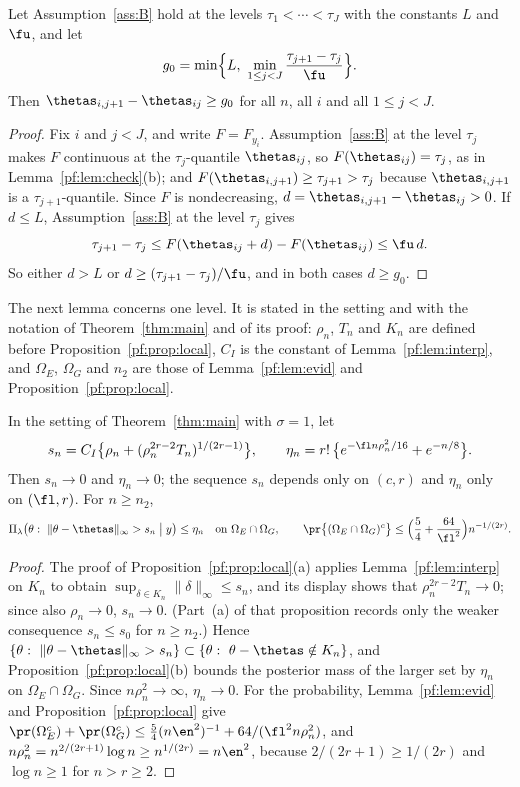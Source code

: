 \begin{lemma}[separation]\label{pf:lem:gap}
Let Assumption~\ref{ass:B} hold at the levels $\tau_1<\cdots<\tau_J$ with the constants $L$ and $\fu$, and let
\[
g_0=\min\Bigl\{L,\ \min_{1\le j<J}\frac{\tau_{j+1}-\tau_j}{\fu}\Bigr\}.
\]
Then $\thetas_{i,j+1}-\thetas_{ij}\ge g_0$ for all $n$, all $i$ and all $1\le j<J$.
\end{lemma}

\begin{proof}
Fix $i$ and $j<J$, and write $F=F_{y_i}$. Assumption~\ref{ass:B} at the level $\tau_j$ makes $F$ continuous at the $\tau_j$-quantile $\thetas_{ij}$, so $F(\thetas_{ij})=\tau_j$, as in Lemma~\ref{pf:lem:check}(b); and $F(\thetas_{i,j+1})\ge\tau_{j+1}>\tau_j$ because $\thetas_{i,j+1}$ is a $\tau_{j+1}$-quantile. Since $F$ is nondecreasing, $d=\thetas_{i,j+1}-\thetas_{ij}>0$. If $d\le L$, Assumption~\ref{ass:B} at the level $\tau_j$ gives
\[
\tau_{j+1}-\tau_j\le F(\thetas_{ij}+d)-F(\thetas_{ij})\le\fu\,d .
\]
So either $d>L$ or $d\ge(\tau_{j+1}-\tau_j)/\fu$, and in both cases $d\ge g_0$.
\end{proof}

The next lemma concerns one level. It is stated in the setting and with the notation of Theorem~\ref{thm:main} and of its proof: $\rho_n$, $T_n$ and $K_n$ are defined before Proposition~\ref{pf:prop:local}, $C_I$ is the constant of Lemma~\ref{pf:lem:interp}, and $\Omega_E$, $\Omega_G$ and $n_2$ are those of Lemma~\ref{pf:lem:evid} and Proposition~\ref{pf:prop:local}.

\begin{lemma}\label{pf:lem:sup}
In the setting of Theorem~\ref{thm:main} with $\sigma=1$, let
\[
s_n=C_I\bigl\{\rho_n+(\rho_n^{2r-2}T_n)^{1/(2r-1)}\bigr\},\qquad \eta_n=r!\,\bigl\{e^{-\fl n\rho_n^2/16}+e^{-n/8}\bigr\}.
\]
Then $s_n\to0$ and $\eta_n\to0$; the sequence $s_n$ depends only on $(c,r)$ and $\eta_n$ only on $(\fl,r)$. For $n\ge n_2$,
\[
\Pi_\lambda\bigl(\theta:\ \|\theta-\thetas\|_\infty>s_n\bigm|y\bigr)\le\eta_n\quad\text{on }\Omega_E\cap\Omega_G,
\qquad
\pr\bigl\{(\Omega_E\cap\Omega_G)^c\bigr\}\le\Bigl(\frac54+\frac{64}{\fl^2}\Bigr)n^{-1/(2r)} .
\]
\end{lemma}

\begin{proof}
The proof of Proposition~\ref{pf:prop:local}(a) applies Lemma~\ref{pf:lem:interp} on $K_n$ to obtain $\sup_{\delta\in K_n}\|\delta\|_\infty\le s_n$, and its display shows that $\rho_n^{2r-2}T_n\to0$; since also $\rho_n\to0$, $s_n\to0$. (Part~(a) of that proposition records only the weaker consequence $s_n\le s_0$ for $n\ge n_2$.) Hence $\{\theta:\ \|\theta-\thetas\|_\infty>s_n\}\subset\{\theta:\ \theta-\thetas\notin K_n\}$, and Proposition~\ref{pf:prop:local}(b) bounds the posterior mass of the larger set by $\eta_n$ on $\Omega_E\cap\Omega_G$. Since $n\rho_n^2\to\infty$, $\eta_n\to0$. For the probability, Lemma~\ref{pf:lem:evid} and Proposition~\ref{pf:prop:local} give $\pr(\Omega_E^c)+\pr(\Omega_G^c)\le\tfrac54(n\en^2)^{-1}+64/(\fl^2n\rho_n^2)$, and $n\rho_n^2=n^{2/(2r+1)}\log n\ge n^{1/(2r)}=n\en^2$, because $2/(2r+1)\ge1/(2r)$ and $\log n\ge1$ for $n>r\ge2$.
\end{proof}

